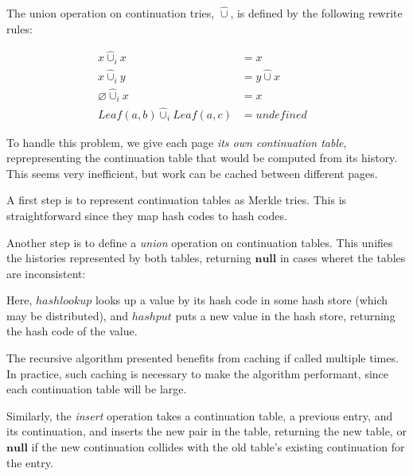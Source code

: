 \documentclass{article}
\begin{document}
The union operation on continuation tries, $\hat{\cup}$, is defined by the following rewrite rules:

\begin{align*}
  x \hat{\cup}_i x &= x & \\
  x \hat{\cup}_i y &= y \hat{\cup} x & \\
  \varnothing \hat{\cup}_i x &= x & \\
  Leaf(a, b) \hat{\cup}_i Leaf(a, c) &= undefined &
\end{align*}

To handle this problem, we give each page \emph{its own continuation table}, reprepresenting the continuation table that would be computed from its history.  This seems very inefficient, but work can be cached between different pages.

A first step is to represent continuation tables as Merkle tries.  This is straightforward since they map hash codes to hash codes.

Another step is to define a \emph{union} operation on continuation tables.  This unifies the histories represented by both tables, returning $\mathbf{null}$ in cases wheret the tables are inconsistent:

\begin{algorithm}
\end{algorithm}

Here, $hashlookup$ looks up a value by its hash code in some hash store (which may be distributed), and $hashput$ puts a new value in the hash store, returning the hash code of the value.

The recursive algorithm presented benefits from caching if called multiple times.  In practice, such caching is necessary to make the algorithm performant, since each continuation table will be large.

Similarly, the \emph{insert} operation takes a continuation table, a previous entry, and its continuation, and inserts the new pair in the table, returning the new table, or $\mathbf{null}$ if the new continuation collides with
the old table's existing continuation for the entry.
\end{document}
